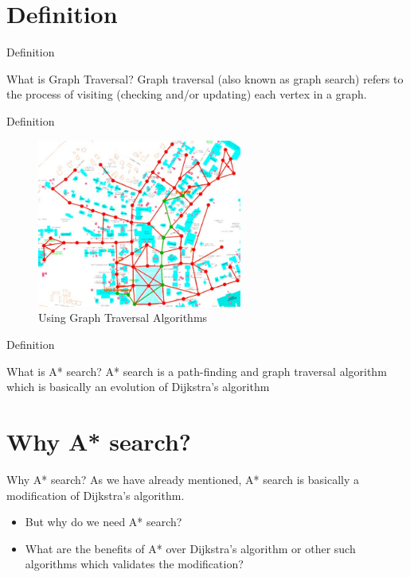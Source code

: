 \documentclass[14pt]{beamer}
\begin{document}
\section{Definition}
\begin{frame}{Definition}
	\begin{block}{\centering What is Graph Traversal?}
		Graph traversal (also known as graph search) refers to the process of visiting (checking and/or updating) each vertex in a graph. 
	\end{block}
\end{frame}
\begin{frame}{Definition}
	\begin{figure}[h]
	\centering
		\includegraphics[width=0.6\textwidth, height=0.6\textheight]{mapgraph.jpg}
		\caption{Using Graph Traversal Algorithms}
		\label{pic:GraphTraversal}
	\end{figure}
\end{frame}


\begin{frame}{Definition}
	\begin{block}{\centering What is A* search?}
		A* search is a path-finding and graph traversal algorithm which is basically an evolution of Dijkstra's algorithm
	\end{block}
\end{frame}

\section{Why A* search?}
\begin{frame}{Why A* search?}
	As we have already mentioned, A* search is basically a modification of Dijkstra's algorithm. 
	\begin{itemize}
		\item<1-> But why do we need A* search? 
		\item<2-> What are the benefits of A* over Dijkstra's algorithm or other such algorithms which validates the modification?
	\end{itemize}
\end{frame}
	
\end{document}
